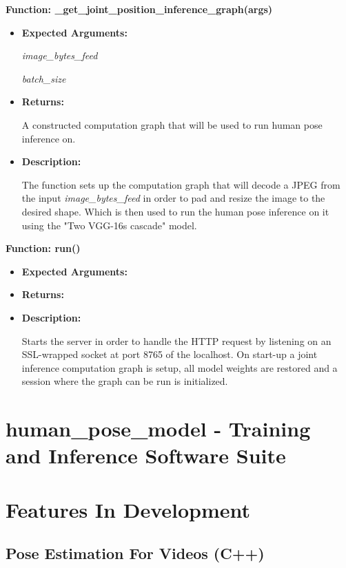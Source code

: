 \documentclass{scrreprt}
\begin{document}
\textbf{Function: \_get\_joint\_position\_inference\_graph(args)}
\begin{itemize}
    \item \textbf{Expected Arguments:}

            \quad\textit{image\_bytes\_feed}

            \quad\textit{batch\_size}

    \item \textbf{Returns:}

            A constructed computation graph that will be used to run human pose inference on.

    \item \textbf{Description:}

            The function sets up the computation graph that will decode a JPEG from the input \textit{image\_bytes\_feed} in order to pad and resize the image to the desired shape. Which is then used to run the human pose inference on it using the "Two VGG-16s cascade" model.
\end{itemize}

\textbf{Function: run()}
\begin{itemize}
    \item \textbf{Expected Arguments:}

    \item \textbf{Returns:}

    \item \textbf{Description:}

            Starts the server in order to handle the HTTP request by listening on an SSL-wrapped socket at port 8765 of the localhost. On start-up a joint inference computation graph is setup, all model weights are restored and a session where the graph can be run is initialized.

\end{itemize}

\section{human\_pose\_model - Training and Inference Software Suite}

\break

\section{Features In Development}

\subsection{Pose Estimation For Videos (C++)}
\end{document}

